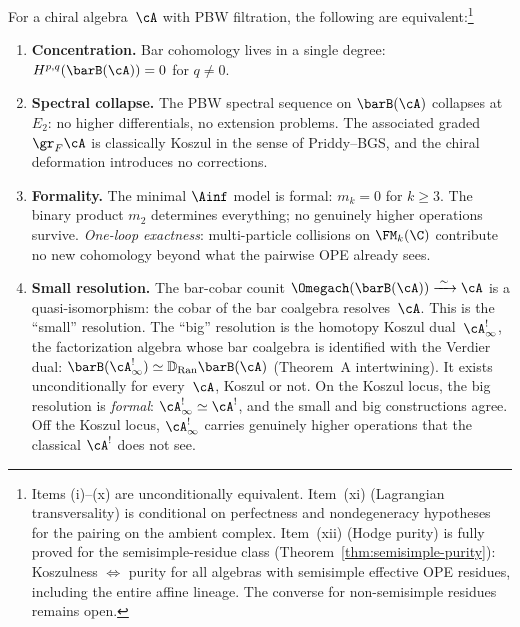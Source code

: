 \begin{theorem}
\label{thm:koszul-dodecahedron}
For a chiral algebra~$\cA$ with PBW filtration, the following are
equivalent\textup{:}\footnote{Items \textup{(i)--(x)} are
unconditionally equivalent. Item~\textup{(xi)}
\textup{(}Lagrangian transversality\textup{)} is conditional on
perfectness and nondegeneracy hypotheses for the pairing on the
ambient complex. Item~\textup{(xii)} \textup{(}Hodge
purity\textup{)} is fully proved for the semisimple-residue class
\textup{(}Theorem~\textup{\ref{thm:semisimple-purity}):}
Koszulness $\Leftrightarrow$ purity for all
algebras with semisimple effective OPE residues, including the
entire affine lineage. The converse for non-semisimple residues
remains open.}
\begin{enumerate}[label=\textup{(\roman*)}]
\item \textbf{Concentration.}
 Bar cohomology lives in a single degree:
 $H^{p,q}(\barB(\cA)) = 0$ for $q \neq 0$.

\item \textbf{Spectral collapse.}
 The PBW spectral sequence on $\barB(\cA)$ collapses at~$E_2$: no
 higher differentials, no extension problems. The associated graded
 $\gr_F\cA$ is classically Koszul in the sense of Priddy--BGS, and
 the chiral deformation introduces no corrections.

\item \textbf{Formality.}
 The minimal $\Ainf$ model is formal: $m_k = 0$ for $k \geq 3$.
 The binary product $m_2$ determines everything; no genuinely higher
 operations survive. \emph{One-loop exactness}: multi-particle
 collisions on $\FM_k(\C)$ contribute no new cohomology beyond what
 the pairwise OPE already sees.

\item \textbf{Small resolution.}
 The bar-cobar counit
 $\Omegach(\barB(\cA)) \xrightarrow{\;\sim\;} \cA$ is a
 quasi-isomorphism: the cobar of the bar coalgebra resolves~$\cA$.
 This is the ``small'' resolution. The ``big'' resolution is the
 homotopy Koszul dual~$\cA^!_\infty$, the factorization algebra
 whose bar coalgebra is identified with the Verdier dual:
 $\barB(\cA^!_\infty) \simeq \mathbb{D}_{\operatorname{Ran}}\barB(\cA)$
 (Theorem~A intertwining). It exists unconditionally for
 every~$\cA$, Koszul or not. On the Koszul locus, the big
 resolution is \emph{formal}: $\cA^!_\infty \simeq \cA^!$, and
 the small and big constructions agree. Off the Koszul locus,
 $\cA^!_\infty$ carries genuinely higher operations that the
 classical $\cA^!$ does not see.


\end{enumerate}
\end{theorem}
